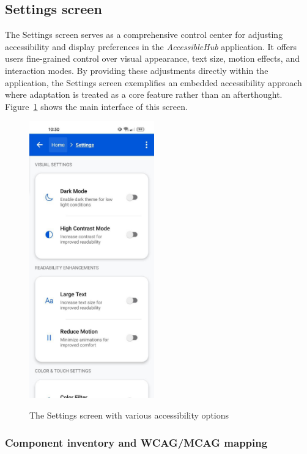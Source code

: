 \subsection{Settings screen}
\label{subsec:settings-screen}

The Settings screen serves as a comprehensive control center for adjusting accessibility and display preferences in the \textit{AccessibleHub} application. It offers users fine-grained control over visual appearance, text size, motion effects, and interaction modes. By providing these adjustments directly within the application, the Settings screen exemplifies an embedded accessibility approach where adaptation is treated as a core feature rather than an afterthought. Figure~\ref{fig:settings_screen_main} shows the main interface of this screen.

\begin{figure}[ht]
    \centering
    \includegraphics[width=0.48\textwidth, alt={Settings screen showing accessibility options}]{img/settings_normal.jpg}
    \caption{The Settings screen with various accessibility options}
    \label{fig:settings_screen_main}
\end{figure}

\subsubsection{Component inventory and WCAG/MCAG mapping}

